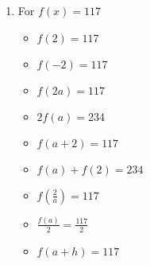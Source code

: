 \begin{enumerate}
\begin{multicols}{3}
\begin{itemize}
\vfill

\columnbreak

\item $\frac{f(a)}{2} =  \frac{3a^2+3a-2}{2}$

\vfill

\columnbreak


\item  $f(a + h) = 3a^2 + 6ah + 3h^2+3a+3h-2$

\end{itemize}
\end{multicols}



\item For $f(x) = 117$

\begin{multicols}{3}
\begin{itemize}

\item  $f(2) = 117$
\item  $f(-2) = 117$
\item  $f(2a) = 117$

\end{itemize}
\end{multicols}

\begin{multicols}{3}
\begin{itemize}

\item  $2 f(a) = 234$
\item $f(a+2) = 117$
\item $f(a) + f(2) = 234$

\end{itemize}
\end{multicols}

\begin{multicols}{3}
\begin{itemize}

\item  $f \left( \frac{2}{a} \right) = 117$ 

\vfill

\columnbreak

\item $\frac{f(a)}{2} = \frac{117}{2}$

\vfill

\columnbreak


\item  $f(a + h) = 117$

\end{itemize}
\end{multicols}




\end{enumerate}
